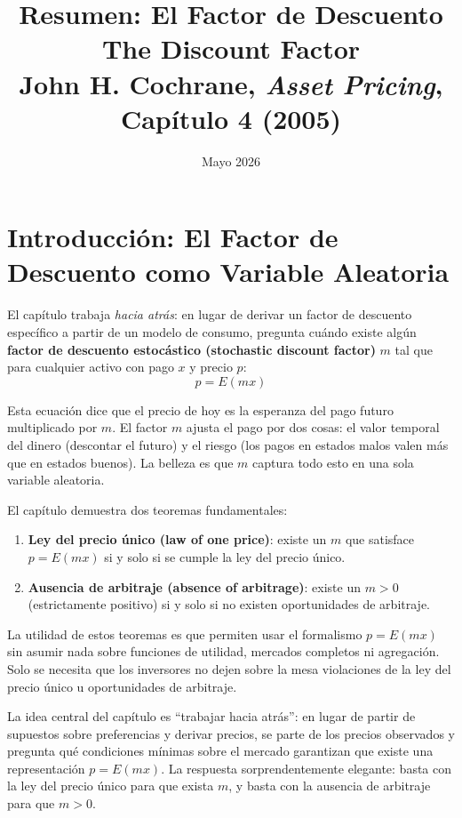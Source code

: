 \documentclass[12pt]{article}
\title{\textbf{Resumen: El Factor de Descuento}\\
\large The Discount Factor\\
\normalsize John H. Cochrane, \textit{Asset Pricing}, Cap\'itulo 4 (2005)}
\author{}
\date{Mayo 2026}
\begin{document}
\maketitle
\tableofcontents
\newpage

\section{Introducci\'on: El Factor de Descuento como Variable Aleatoria}

El cap\'itulo trabaja \emph{hacia atr\'as}: en lugar de derivar un factor de descuento espec\'ifico a partir de un modelo de consumo, pregunta cu\'ando existe alg\'un \textbf{factor de descuento estoc\'astico (stochastic discount factor)} $m$ tal que para cualquier activo con pago $x$ y precio $p$:
\begin{equation}
    p = E(mx)
\end{equation}

\begin{intuicionmat}
Esta ecuaci\'on dice que el precio de hoy es la esperanza del pago futuro multiplicado por $m$. El factor $m$ ajusta el pago por dos cosas: el valor temporal del dinero (descontar el futuro) y el riesgo (los pagos en estados malos valen m\'as que en estados buenos). La belleza es que $m$ captura todo esto en una sola variable aleatoria.
\end{intuicionmat}

El cap\'itulo demuestra dos teoremas fundamentales:
\begin{enumerate}
    \item \textbf{Ley del precio \'unico (law of one price)}: existe un $m$ que satisface $p = E(mx)$ si y solo si se cumple la ley del precio \'unico.
    \item \textbf{Ausencia de arbitraje (absence of arbitrage)}: existe un $m > 0$ (estrictamente positivo) si y solo si no existen oportunidades de arbitraje.
\end{enumerate}

La utilidad de estos teoremas es que permiten usar el formalismo $p = E(mx)$ sin asumir nada sobre funciones de utilidad, mercados completos ni agregaci\'on. Solo se necesita que los inversores no dejen sobre la mesa violaciones de la ley del precio \'unico u oportunidades de arbitraje.

\begin{intuicion}
La idea central del cap\'itulo es ``trabajar hacia atr\'as'': en lugar de partir de supuestos sobre preferencias y derivar precios, se parte de los precios observados y pregunta qu\'e condiciones m\'inimas sobre el mercado garantizan que existe una representaci\'on $p = E(mx)$. La respuesta sorprendentemente elegante: basta con la ley del precio \'unico para que exista $m$, y basta con la ausencia de arbitraje para que $m > 0$.
\end{intuicion}
\end{document}
